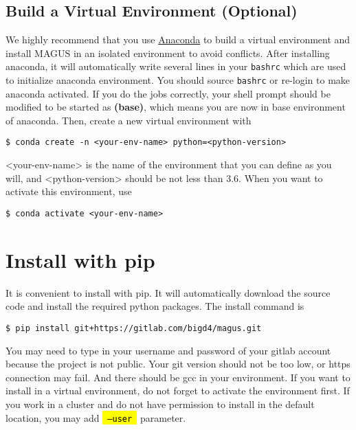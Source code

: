 \documentclass[12pt,oneside]{book}
\newcommand{\code}[1]{
  \begingroup
  \sethlcolor{Seashell}
  {\hl{\texttt{~#1~}}}
  \endgroup
}
\newcommand{\file}[1]{\texttt{#1}}
\newcommand{\chref}[3][blue]{\textcolor{#1}{\href{#2}{#3}}} %
\begin{document}
\subsection{Build a Virtual Environment (Optional)}
We highly recommend that you use \chref{https://www.anaconda.com}{Anaconda} to build a virtual environment and install MAGUS in an isolated environment to avoid conflicts. After installing anaconda, it will automatically write several lines in your \file{bashrc} which are used to initialize anaconda environment. You should source \file{bashrc} or re-login to make anaconda activated.
If you do the jobs correctly, your shell prompt should be modified to be started as \textbf{(base)}, which means you are now in base environment of anaconda. Then, create a new virtual environment with
\begin{tcolorbox}
\begin{verbatim}
$ conda create -n <your-env-name> python=<python-version>
\end{verbatim}
\end{tcolorbox}
<your-env-name> is the name of the environment that you can define as you will, and <python-version> should be not less than 3.6. When you want to activate this environment, use
\begin{tcolorbox}
\begin{verbatim}
$ conda activate <your-env-name>
\end{verbatim}
\end{tcolorbox}

\section{Install with pip}
It is convenient to install with pip. It will automatically download the source code and install the required python packages. The install command is
\begin{tcolorbox}
    \begin{verbatim}
$ pip install git+https://gitlab.com/bigd4/magus.git
    \end{verbatim}
\end{tcolorbox}
You may need to type in your username and password of your gitlab account because the project is not public. Your git version should not be too low, or https connection may fail. And there should be gcc in your environment. If you want to install in a virtual environment, do not forget to activate the environment first. If you work in a cluster and do not have permission to install in the default location, you may add \code{--user} parameter.
\end{document}
